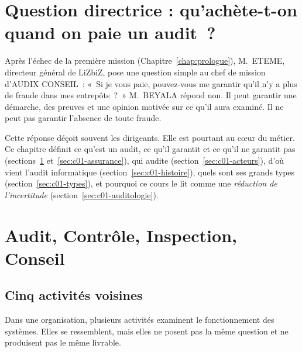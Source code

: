 \bigskip

\section*{Question directrice : qu'achète-t-on quand on paie un audit~?}

Après l'échec de la première mission (Chapitre~\ref{chap:prologue}),
M.~ETEME, directeur général de LiZbiZ, pose une question simple au chef de
mission d'AUDIX CONSEIL~: «~Si je vous paie, pouvez-vous me garantir qu'il
n'y a plus de fraude dans mes entrepôts~?~» M.~BEYALA répond non. Il peut
garantir une démarche, des preuves et une opinion motivée sur ce qu'il aura
examiné. Il ne peut pas garantir l'absence de toute fraude.

Cette réponse déçoit souvent les dirigeants. Elle est pourtant au cœur du
métier. Ce chapitre définit ce qu'est un audit, ce qu'il garantit et ce
qu'il ne garantit pas (sections~\ref{sec:c01-notions}
et~\ref{sec:c01-assurance}), qui audite (section~\ref{sec:c01-acteurs}),
d'où vient l'audit informatique (section~\ref{sec:c01-histoire}), quels sont
ses grands types (section~\ref{sec:c01-types}), et pourquoi ce cours le lit
comme une \emph{réduction de l'incertitude} (section~\ref{sec:c01-auditologie}).

\separateur

\section{Audit, Contrôle, Inspection, Conseil}
\label{sec:c01-notions}

\subsection{Cinq activités voisines}

Dans une organisation, plusieurs activités examinent le fonctionnement des
systèmes. Elles se ressemblent, mais elles ne posent pas la même question et
ne produisent pas le même livrable.

